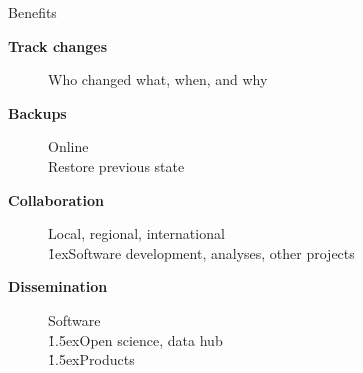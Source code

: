 \documentclass[aspectratio=169]{beamer}
\begin{document}



\begin{frame}{Benefits}\small
  \begin{description}
    \item[\bf Track changes] Who changed what, when, and why\\[5ex]
    \item[\bf Backups] Online\\[1ex]
    Restore previous state\\[5ex]
    \item[\bf Collaboration] Local, regional, international\\[1ex]
    \h{1ex}Software development, analyses, other projects\\[5ex]
    \item[\bf Dissemination] Software\\[1ex]
    \h{1.5ex}Open science, data hub\\[1ex]
    \h{1.5ex}Products\\[1ex]
  \end{description}
\end{frame}



\end{document}
